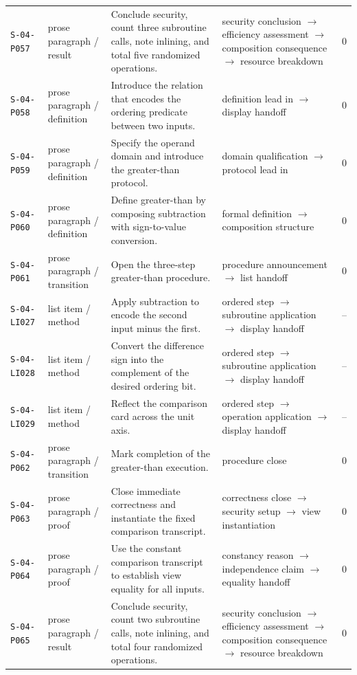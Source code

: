 \documentclass[10pt]{article}
\begin{document}
\begin{longtable}{@{}p{}p{}p{}p{}p{}@{}}
\texttt{S-04-P057}&prose paragraph / result&Conclude security, count three subroutine calls, note inlining, and total five randomized operations.&security conclusion $\rightarrow$ efficiency assessment $\rightarrow$ composition consequence $\rightarrow$ resource breakdown&0\\
\texttt{S-04-P058}&prose paragraph / definition&Introduce the relation that encodes the ordering predicate between two inputs.&definition lead in $\rightarrow$ display handoff&0\\
\texttt{S-04-P059}&prose paragraph / definition&Specify the operand domain and introduce the greater-than protocol.&domain qualification $\rightarrow$ protocol lead in&0\\
\texttt{S-04-P060}&prose paragraph / definition&Define greater-than by composing subtraction with sign-to-value conversion.&formal definition $\rightarrow$ composition structure&0\\
\texttt{S-04-P061}&prose paragraph / transition&Open the three-step greater-than procedure.&procedure announcement $\rightarrow$ list handoff&0\\
\texttt{S-04-LI027}&list item / method&Apply subtraction to encode the second input minus the first.&ordered step $\rightarrow$ subroutine application $\rightarrow$ display handoff&--\\
\texttt{S-04-LI028}&list item / method&Convert the difference sign into the complement of the desired ordering bit.&ordered step $\rightarrow$ subroutine application $\rightarrow$ display handoff&--\\
\texttt{S-04-LI029}&list item / method&Reflect the comparison card across the unit axis.&ordered step $\rightarrow$ operation application $\rightarrow$ display handoff&--\\
\texttt{S-04-P062}&prose paragraph / transition&Mark completion of the greater-than execution.&procedure close&0\\
\texttt{S-04-P063}&prose paragraph / proof&Close immediate correctness and instantiate the fixed comparison transcript.&correctness close $\rightarrow$ security setup $\rightarrow$ view instantiation&0\\
\texttt{S-04-P064}&prose paragraph / proof&Use the constant comparison transcript to establish view equality for all inputs.&constancy reason $\rightarrow$ independence claim $\rightarrow$ equality handoff&0\\
\texttt{S-04-P065}&prose paragraph / result&Conclude security, count two subroutine calls, note inlining, and total four randomized operations.&security conclusion $\rightarrow$ efficiency assessment $\rightarrow$ composition consequence $\rightarrow$ resource breakdown&0\\

\end{longtable}
\end{document}
